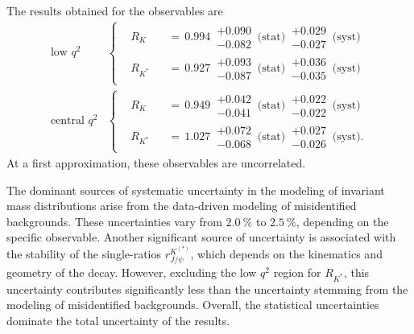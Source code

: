 The results obtained for the observables are
\begin{align*}
    \text{low $q^2$} 
    &\left\{
    \begin{aligned}
        &R_{K}  \!\!\!\!\!\!\!&&=\, 0.994 \,\substack{+0.090 \\ -0.082}\,\text{(stat)}\,\substack{+0.029 \\ -0.027}\,\text{(syst)}\\
        &R_{K^*}\!\!\!\!\!\!\!&&=\, 0.927 \,\substack{+0.093 \\ -0.087}\,\text{(stat)}\,\substack{+0.036 \\ -0.035}\,\text{(syst)}
    \end{aligned}
    \right. \\
    \text{central $q^2$} 
    &\left\{
    \begin{aligned}
        &R_{K}  \!\!\!\!\!\!\!&&=\, 0.949 \,\substack{+0.042 \\ -0.041}\,\text{(stat)}\,\substack{+0.022 \\ -0.022}\,\text{(syst)}\\
        &R_{K^*}\!\!\!\!\!\!\!&&=\, 1.027 \,\substack{+0.072 \\ -0.068}\,\text{(stat)}\,\substack{+0.027 \\ -0.026}\,\text{(syst)}.
    \end{aligned}
    \right.
\end{align*}
At a first approximation, these observables are uncorrelated.

The dominant sources of systematic uncertainty in the modeling of 
invariant mass distributions arise from the data-driven modeling 
of misidentified backgrounds. These uncertainties vary from 
$\SI{2.0}{\%}$ to $\SI{2.5}{\%}$, depending on the specific observable. 
Another significant source of uncertainty is associated with the 
stability of the single-ratios $r^{K^{(*)}}_{J\!/\!\psi}$, which depends on 
the kinematics and geometry of the decay. However, excluding the low 
$q^2$ region for $R_{K^*}$, this uncertainty contributes significantly 
less than the uncertainty stemming from the modeling of misidentified 
backgrounds. Overall, the statistical uncertainties dominate the total 
uncertainty of the results.

